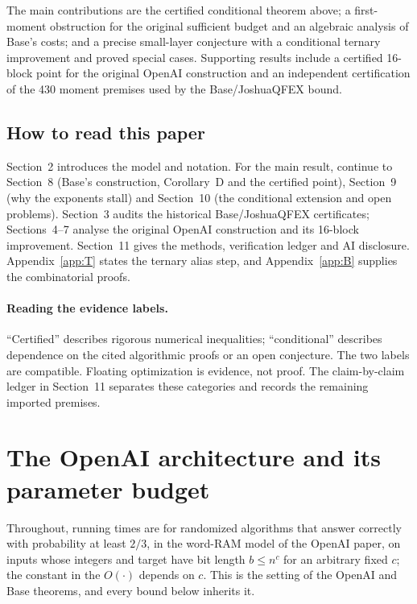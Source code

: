 \documentclass[11pt]{article}
\theoremstyle{plain}
\begin{document}
The main contributions are the certified conditional theorem above; a first-moment obstruction for the original sufficient budget and an algebraic analysis of Base's costs; and a precise small-layer conjecture with a conditional ternary improvement and proved special cases. Supporting results include a certified 16-block point for the original OpenAI construction and an independent certification of the 430 moment premises used by the Base/JoshuaQFEX bound.

\subsection*{How to read this paper}
Section~2 introduces the model and notation. For the main result, continue to Section~8 (Base's construction, Corollary~D and the certified point), Section~9 (why the exponents stall) and Section~10 (the conditional extension and open problems). Section~3 audits the historical Base/JoshuaQFEX certificates; Sections~4--7 analyse the original OpenAI construction and its 16-block improvement. Section~11 gives the methods, verification ledger and AI disclosure. Appendix~\ref{app:T} states the ternary alias step, and Appendix~\ref{app:B} supplies the combinatorial proofs.


\paragraph{Reading the evidence labels.}
``Certified'' describes rigorous numerical inequalities; ``conditional'' describes dependence on the cited algorithmic proofs or an open conjecture. The two labels are compatible. Floating optimization is evidence, not proof. The claim-by-claim ledger in Section~11 separates these categories and records the remaining imported premises.


\section{The OpenAI architecture and its parameter budget}

Throughout, running times are for randomized algorithms that answer correctly with probability at least $2/3$, in the word-RAM model of the OpenAI paper, on inputs whose integers and target have bit length $b \le n^c$ for an arbitrary fixed $c$; the constant in the $O(\cdot)$ depends on $c$. This is the setting of the OpenAI and Base theorems, and every bound below inherits it.
\end{document}
